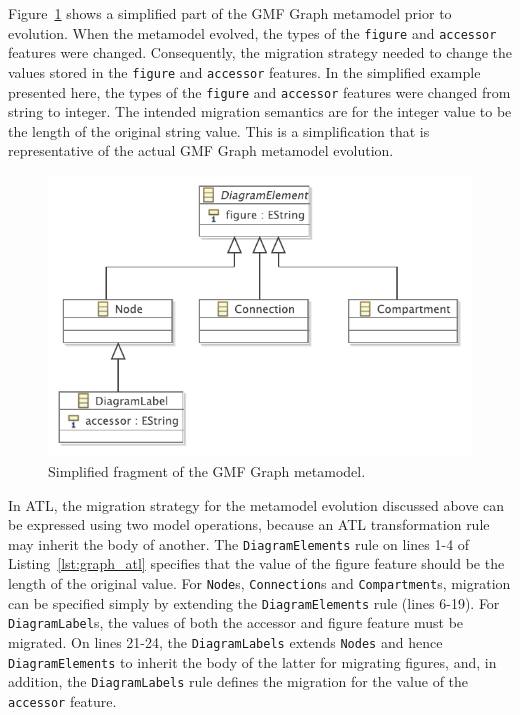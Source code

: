 Figure~\ref{fig:subtyping} shows a simplified part of the GMF Graph metamodel prior to evolution. When the metamodel evolved, the types of the \texttt{figure} and \texttt{accessor} features were changed. Consequently, the migration strategy needed to change the values stored in the \texttt{figure} and \texttt{accessor} features. In the simplified example presented here, the types of the \texttt{figure} and \texttt{accessor} features were changed from string to integer. The intended migration semantics are for the integer value to be the length of the original string value. This is a simplification that is representative of the actual GMF Graph metamodel evolution.

\begin{figure}[htbp]
  \centering
  \includegraphics[scale=0.75]{6.Evaluation/images/subtyping.pdf}
  \caption{Simplified fragment of the GMF Graph metamodel.}
  \label{fig:subtyping}
\end{figure}

In ATL, the migration strategy for the metamodel evolution discussed above can be expressed using two model operations, because an ATL transformation rule may inherit the body of another. The \texttt{DiagramElements} rule on lines 1-4 of Listing~\ref{lst:graph_atl} specifies that the value of the figure feature should be the length of the original value. For \texttt{Node}s, \texttt{Connection}s and \texttt{Compartment}s, migration can be specified simply by extending the \texttt{DiagramElements} rule (lines 6-19). For \texttt{DiagramLabel}s, the values of both the accessor and figure feature must be migrated. On lines 21-24, the \texttt{DiagramLabels} extends \texttt{Nodes} and hence \texttt{DiagramElements} to inherit the body of the latter for migrating figures, and, in addition, the \texttt{DiagramLabels} rule defines the migration for the value of the \texttt{accessor} feature.

